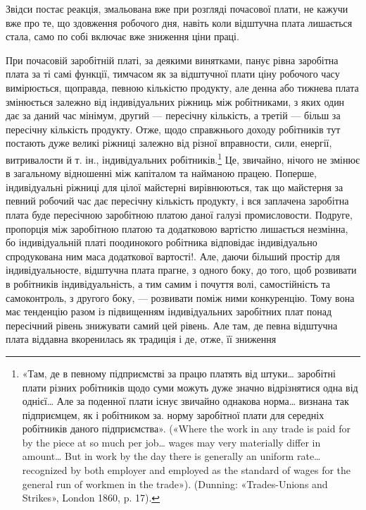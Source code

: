 \parcont{}  %
Звідси постає реакція, змальована вже при розгляді почасової
плати, не кажучи вже про те, що здовження робочого дня, навіть
коли відштучна плата лишається стала, само по собі включає
вже зниження ціни праці.

При почасовій заробітній платі, за деякими винятками, панує
рівна заробітна плата за ті самі функції, тимчасом як за відштучної
плати ціну робочого часу вимірюється, щоправда, певною
кількістю продукту, але денна або тижнева плата змінюється
залежно від індивідуальних ріжниць між робітниками, з яких
один дає за даний час мінімум, другий — пересічну кількість,
а третій — більш за пересічну кількість продукту. Отже, щодо
справжнього доходу робітників тут постають дуже великі ріжниці
залежно від різної вправности, сили, енергії, витривалости
й т. ін., індивідуальних робітників.\footnote{
«Там, де в певному підприємстві за працю платять від штуки\dots{}
заробітні плати різних робітників щодо суми можуть дуже значно відрізнятися
одна від однієї\dots{} Але за поденної плати існує звичайно однакова
норма\dots{} визнана так підприємцем, як і робітником за. норму заробітної
плати для середніх робітників даного підприємства». («Where the
work in any trade is paid for by the piece at so much per job\dots{} wages may
very materially differ in amount\dots{} But in work by the day there is generally
an uniform rate\dots{} recognized by both employer and employed as the
standard of wages for the general run of workmen in the trade»). (Dunning:
«Trades-Unions and Strikes», London 1860, p. 17).
} Це, звичайно, нічого не
змінює в загальному відношенні між капіталом та найманою
працею. Поперше, індивідуальні ріжниці для цілої майстерні
вирівнюються, так що майстерня за певний робочий час дає пересічну
кількість продукту, і вся заплачена заробітна плата буде
пересічною заробітною платою даної галузі промисловости. Подруге,
пропорція між заробітною платою та додатковою вартістю
лишається незмінна, бо індивідуальній платі поодинокого робітника
відповідає індивідуально спродукована ним маса додаткової
вартості!. Але, даючи більший простір для індивідуальносте,
відштучна плата прагне, з одного боку, до того, щоб розвивати в
робітників індивідуальність, а тим самим і почуття волі, самостійність
та самоконтроль, з другого боку, — розвивати поміж
ними конкуренцію. Тому вона має тенденцію разом із підвищенням
індивідуальних заробітних плат понад пересічний рівень
знижувати самий цей рівень. Але там, де певна відштучна
плата віддавна вкоренилась як традиція і де, отже, її зниження
